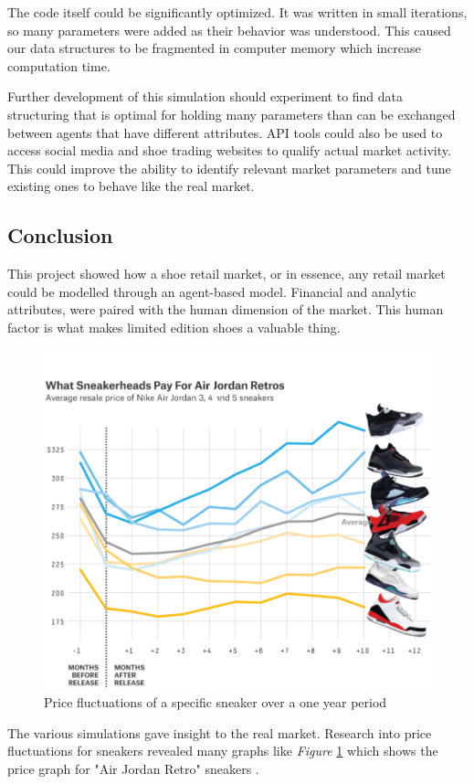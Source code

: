 \documentclass[12pt]{article}
\begin{document}
The code itself could be significantly optimized. It was written in small iterations, so many parameters were added as their behavior was understood. This caused our data structures to be fragmented in computer memory which increase computation time.

Further development of this simulation should experiment to find data structuring that is optimal for holding many parameters than can be exchanged between agents that have different attributes. API tools could also be used to access social media and shoe trading websites to qualify actual market activity. This could improve the ability to identify relevant market parameters and tune existing ones to behave like the real market.

\subsection{Conclusion}

This project showed how a shoe retail market, or in essence, any retail market could be modelled through an agent-based model. Financial and analytic attributes, were paired with the human dimension of the market. This human factor is what makes limited edition shoes a valuable thing.

\begin{figure}[h]
    \centering
    \includegraphics[width=0.6\columnwidth]{RealSneakersPrice.PNG}
    \caption{Price fluctuations of a specific sneaker over a one year period \cite{538} }
    \label{Jordans}
\end{figure}

The various simulations gave insight to the real market. Research into price fluctuations for sneakers revealed many graphs like \textit{Figure} \ref{Jordans}  which shows the price graph for "Air Jordan Retro" sneakers \cite{538}. 
\end{document}
